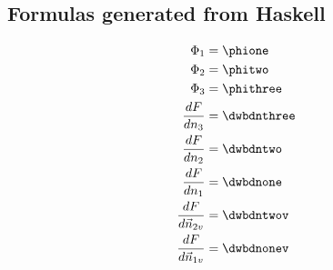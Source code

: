 \documentclass[letterpaper,twocolumn,amsmath,amssymb,jcp,10pt,aip]{revtex4-1}
\begin{document}
\begin{widetext}
\section{Formulas generated from Haskell}


\begin{align}
  \Phi_1 &= \phione \\
  \Phi_2 &= \phitwo \\
  \Phi_3 &= \phithree \\
  \frac{d F}{dn_3} &= \dwbdnthree \\
  \frac{d F}{dn_2} &= \dwbdntwo \\
  \frac{d F}{dn_1} &= \dwbdnone \\
  \frac{d F}{d\vec{n}_{2v}} &= \dwbdntwov \\
  \frac{d F}{d\vec{n}_{1v}} &= \dwbdnonev
\end{align}
\end{widetext}

\end{document}
